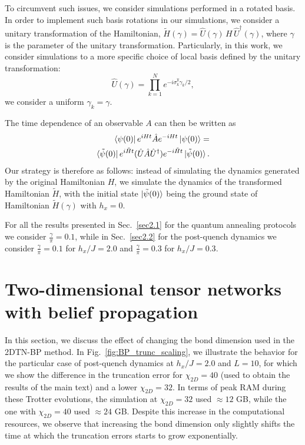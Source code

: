 \documentclass[aps,pra,reprint,amssymb,superscriptaddress]{revtex4-2}
\begin{document}
To circumvent such issues, we consider simulations performed in a rotated basis. In order to implement such basis rotations in our simulations, we consider a unitary transformation of the Hamiltonian,
$ \tilde{H}(\gamma) = \hat{U}(\gamma)\, H\, \hat{U}^{\dagger}(\gamma) $,
where $\gamma$ is the parameter of the unitary transformation.
Particularly, in this work, we consider simulations to a more specific choice of local basis defined by the unitary transformation: 
\begin{equation}
\hat{U}(\gamma) = \prod_{k=1}^N e^{-i \sigma_k^y \gamma_k/2},    
\end{equation}
we consider a uniform $\gamma_k = \gamma$.

The time dependence of an observable $A$ can then be written as
\begin{equation}
 \begin{split} 
 \bra{\psi(0)} e^{iHt} \hat{A} e^{-iHt} \ket{\psi(0)} = \\ \bra{\tilde{\psi}(0)} e^{i\tilde{H}t} (\hat{U} \hat{A} \hat{U}^{\dagger}) e^{-i\tilde{H}t} \ket{\tilde{\psi}(0)}.
  \end{split} 
  \end{equation}
Our strategy is therefore as follows: instead of simulating the dynamics generated by the original Hamiltonian $H$, we simulate the dynamics of the transformed Hamiltonian $\tilde{H}$, with the initial state ${\ket{\tilde{\psi}(0)}}$ being the ground state of Hamiltonian $\tilde{H}(\gamma)$ with $h_x = 0$.

For all the results presented in Sec.~\ref{sec2.1} for the quantum annealing protocols we consider $\frac{\gamma}{\pi} = 0.1$, while in Sec.~\ref{sec2.2} for the post-quench dynamics we consider $\frac{\gamma}{\pi} = 0.1$ for $h_x/J=2.0$ and $\frac{\gamma}{\pi} = 0.3$ for $h_x/J = 0.3$.


\section{Two-dimensional tensor networks with belief propagation}
\label{app:2dtn}
In this section, we discuss the effect of changing the bond dimension used in  the 2DTN-BP method. In Fig.~\ref{fig:BP_trunc_scaling}, we illustrate the behavior for the particular case of post-quench dynamics at $h_x/J=2.0$ and $L=10$, for which we show the difference in the truncation error for $\chi_{2D}=40$ (used to obtain the results of the main text) and a lower $\chi_{2D}=32$. In terms of peak RAM during these Trotter evolutions, the simulation at $\chi_{2D}=32$ used $\approx 12$ GB, while the one with $\chi_{2D}=40$ used $\approx 24$ GB. Despite this increase in the computational resources, we observe that increasing the bond dimension only slightly shifts the time at which the truncation errors starts to grow exponentially. 
\end{document}
